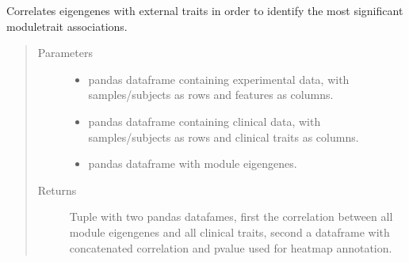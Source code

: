 \documentclass[letterpaper,10pt,english]{sphinxmanual}
\begin{document}

\begin{fulllineitems}
\label{\detokenize{_autosummary/analytics_core.analytics:analytics_core.analytics.wgcnaAnalysis.calculate_ModuleTrait_correlation}}
Correlates eigengenes with external traits in order to identify the most significant module\sphinxhyphen{}trait associations.
\begin{quote}\begin{description}
\item[{Parameters}] \leavevmode\begin{itemize}
\item {} 
 \textendash{} pandas dataframe containing experimental data, with samples/subjects as rows and features as columns.

\item {} 
 \textendash{} pandas dataframe containing clinical data, with samples/subjects as rows and clinical traits as columns.

\item {} 
 \textendash{} pandas dataframe with module eigengenes.

\end{itemize}

\item[{Returns}] \leavevmode
Tuple with two pandas datafames, first the correlation between all module eigengenes and all clinical traits, second a dataframe with concatenated correlation and p\sphinxhyphen{}value used for heatmap annotation.

\end{description}\end{quote}

\end{fulllineitems}

\end{document}
